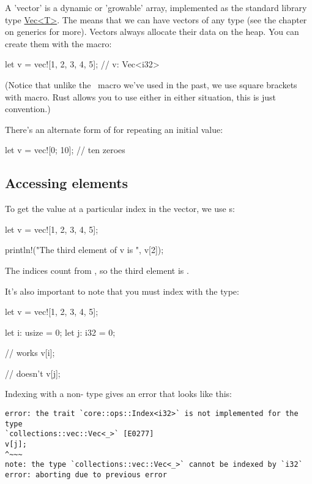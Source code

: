 A 'vector' is a dynamic or 'growable' array, implemented as the standard library type \href{https://doc.rust-lang.org/std/vec/}{Vec<T>}. The 
 means that we can have vectors of any type (see the chapter on generics for more). Vectors always allocate their data on the heap. 
You can create them with the  macro:

\begin{rustc}
let v = vec![1, 2, 3, 4, 5]; // v: Vec<i32>
\end{rustc}

(Notice that unlike the \println\ macro we've used in the past, we use square brackets \code{[]} with  macro. Rust allows you to 
use either in either situation, this is just convention.)

\blank

There's an alternate form of  for repeating an initial value:

\begin{rustc}
let v = vec![0; 10]; // ten zeroes
\end{rustc}

\subsection*{Accessing elements}

To get the value at a particular index in the vector, we use \code{[]}s:

\begin{rustc}
let v = vec![1, 2, 3, 4, 5];

println!("The third element of v is {}", v[2]);
\end{rustc}

The indices count from , so the third element is .

\blank

It's also important to note that you must index with the  type:

\begin{rustc}
let v = vec![1, 2, 3, 4, 5];

let i: usize = 0;
let j: i32 = 0;

// works
v[i];

// doesn't
v[j];
\end{rustc}

Indexing with a non- type gives an error that looks like this:

\begin{verbatim}
error: the trait `core::ops::Index<i32>` is not implemented for the type
`collections::vec::Vec<_>` [E0277]
v[j];
^~~~
note: the type `collections::vec::Vec<_>` cannot be indexed by `i32`
error: aborting due to previous error
\end{verbatim}


